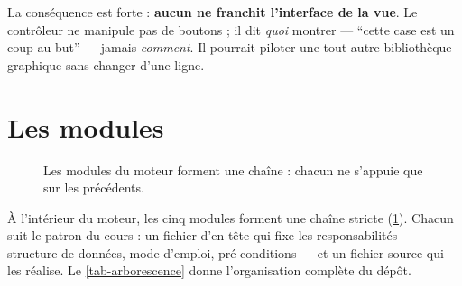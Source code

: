 La conséquence est forte : \textbf{aucun  ne franchit l'interface de la
vue}. Le contrôleur ne manipule pas de boutons ; il dit \emph{quoi} montrer --- \enquote{cette
case est un coup au but} --- jamais \emph{comment}. Il pourrait piloter une tout autre
bibliothèque graphique sans changer d'une ligne.

\section{Les modules}

\begin{figure}[ht]
  \centering
  \caption{Les modules du moteur forment une chaîne : chacun ne s'appuie que sur les
           précédents.}
  \label{fig-modules}
\end{figure}

À l'intérieur du moteur, les cinq modules forment une chaîne stricte (\cref{fig-modules}).
Chacun suit le patron du cours : un fichier d'en-tête qui fixe les responsabilités ---
structure de données, mode d'emploi, pré-conditions --- et un fichier source qui les réalise. Le \cref{tab-arborescence} donne l'organisation complète du dépôt.

